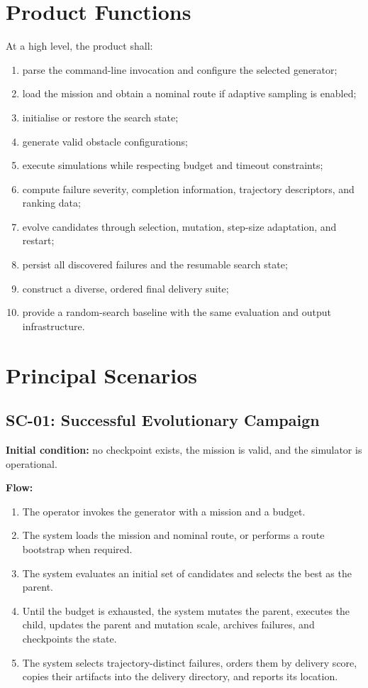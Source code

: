 \documentclass[11pt,a4paper]{report}
\begin{document}
\section{Product Functions}
At a high level, the product shall:
\begin{enumerate}
  \item parse the command-line invocation and configure the selected generator;
  \item load the mission and obtain a nominal route if adaptive sampling is enabled;
  \item initialise or restore the search state;
  \item generate valid obstacle configurations;
  \item execute simulations while respecting budget and timeout constraints;
  \item compute failure severity, completion information, trajectory descriptors, and ranking data;
  \item evolve candidates through selection, mutation, step-size adaptation, and restart;
  \item persist all discovered failures and the resumable search state;
  \item construct a diverse, ordered final delivery suite;
  \item provide a random-search baseline with the same evaluation and output infrastructure.
\end{enumerate}

\section{Principal Scenarios}
\subsection{SC-01: Successful Evolutionary Campaign}
\textbf{Initial condition:} no checkpoint exists, the mission is valid, and the simulator is operational.

\textbf{Flow:}
\begin{enumerate}
  \item The operator invokes the generator with a mission and a budget.
  \item The system loads the mission and nominal route, or performs a route bootstrap when required.
  \item The system evaluates an initial set of candidates and selects the best as the parent.
  \item Until the budget is exhausted, the system mutates the parent, executes the child, updates the parent and mutation scale, archives failures, and checkpoints the state.
  \item The system selects trajectory-distinct failures, orders them by delivery score, copies their artifacts into the delivery directory, and reports its location.
\end{enumerate}
\end{document}
